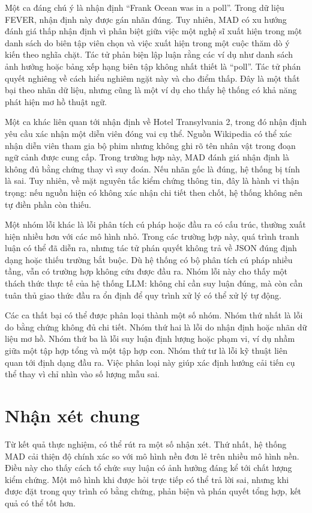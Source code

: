 ﻿\documentclass[oneside,a4paper,12pt]{extreport}
\begin{document}
Một ca đáng chú ý là nhận định ``Frank Ocean was in a poll''. Trong dữ liệu FEVER, nhận định này được gán nhãn đúng. Tuy nhiên, MAD có xu hướng đánh giá thấp nhận định vì phân biệt giữa việc một nghệ sĩ xuất hiện trong một danh sách do biên tập viên chọn và việc xuất hiện trong một cuộc thăm dò ý kiến theo nghĩa chặt. Tác tử phản biện lập luận rằng các ví dụ như danh sách ảnh hưởng hoặc bảng xếp hạng biên tập không nhất thiết là ``poll''. Tác tử phán quyết nghiêng về cách hiểu nghiêm ngặt này và cho điểm thấp. Đây là một thất bại theo nhãn dữ liệu, nhưng cũng là một ví dụ cho thấy hệ thống có khả năng phát hiện mơ hồ thuật ngữ.

Một ca khác liên quan tới nhận định về Hotel Transylvania 2, trong đó nhận định yêu cầu xác nhận một diễn viên đóng vai cụ thể. Nguồn Wikipedia có thể xác nhận diễn viên tham gia bộ phim nhưng không ghi rõ tên nhân vật trong đoạn ngữ cảnh được cung cấp. Trong trường hợp này, MAD đánh giá nhận định là không đủ bằng chứng thay vì suy đoán. Nếu nhãn gốc là đúng, hệ thống bị tính là sai. Tuy nhiên, về mặt nguyên tắc kiểm chứng thông tin, đây là hành vi thận trọng: nếu nguồn hiện có không xác nhận chi tiết then chốt, hệ thống không nên tự điền phần còn thiếu.

Một nhóm lỗi khác là lỗi phân tích cú pháp hoặc đầu ra có cấu trúc, thường xuất hiện nhiều hơn với các mô hình nhỏ. Trong các trường hợp này, quá trình tranh luận có thể đã diễn ra, nhưng tác tử phán quyết không trả về JSON đúng định dạng hoặc thiếu trường bắt buộc. Dù hệ thống có bộ phân tích cú pháp nhiều tầng, vẫn có trường hợp không cứu được đầu ra. Nhóm lỗi này cho thấy một thách thức thực tế của hệ thống LLM: không chỉ cần suy luận đúng, mà còn cần tuân thủ giao thức đầu ra ổn định để quy trình xử lý có thể xử lý tự động.

Các ca thất bại có thể được phân loại thành một số nhóm. Nhóm thứ nhất là lỗi do bằng chứng không đủ chi tiết. Nhóm thứ hai là lỗi do nhận định hoặc nhãn dữ liệu mơ hồ. Nhóm thứ ba là lỗi suy luận định lượng hoặc phạm vi, ví dụ nhầm giữa một tập hợp tổng và một tập hợp con. Nhóm thứ tư là lỗi kỹ thuật liên quan tới định dạng đầu ra. Việc phân loại này giúp xác định hướng cải tiến cụ thể thay vì chỉ nhìn vào số lượng mẫu sai.

\section{Nhận xét chung}

Từ kết quả thực nghiệm, có thể rút ra một số nhận xét. Thứ nhất, hệ thống MAD cải thiện độ chính xác so với mô hình nền đơn lẻ trên nhiều mô hình nền. Điều này cho thấy cách tổ chức suy luận có ảnh hưởng đáng kể tới chất lượng kiểm chứng. Một mô hình khi được hỏi trực tiếp có thể trả lời sai, nhưng khi được đặt trong quy trình có bằng chứng, phản biện và phán quyết tổng hợp, kết quả có thể tốt hơn.
\end{document}
